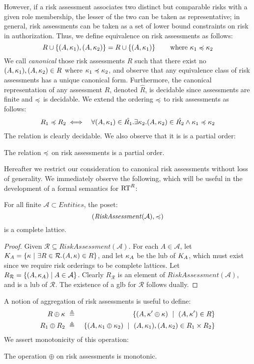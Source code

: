 However, if a risk assessment associates two distinct but comparable
risks with a given role membership, the lesser of the two can be taken
as representative; in general, risk assessments can be taken as a set
of lower bound constraints on risk in authorization.  Thus, we define
equivalence on risk assessments as follows:
$$
R \cup \left\{(A,\kappa_1),(A,\kappa_2)\right\} = R \cup \left\{(A,\kappa_1)\right\} 
\qquad \text{where } \kappa_1 \preccurlyeq \kappa_2 
$$ 
We call \emph{canonical} those risk assessments $R$ such that there
exist no $(A,\kappa_1), (A,\kappa_2) \in R$ where $\kappa_1 \preccurlyeq \kappa_2$,
and observe that any equivalence class of risk assessments has 
a unique canonical form.  Furthermore, the canonical representation 
of any assessment $R$, denoted $\hat{R}$, is decidable since
assessments are finite and $\preccurlyeq$ is decidable.   We extend the 
ordering $\preccurlyeq$ to risk assessments as follows:
\begin{eqnarray*}
R_1 \preccurlyeq R_2 &\iff& \forall (A,\kappa_1) \in \hat{R_1} . \exists \kappa_2. 
(A,\kappa_2) \in \hat{R_2} \wedge \kappa_1 \preccurlyeq \kappa_2
\end{eqnarray*}
The relation is clearly decidable.  We also observe that it is
is a partial order:
\begin{corollary}
The relation $\preccurlyeq$ on risk assessments is a partial order.
\end{corollary} 
Hereafter we restrict our consideration to canonical risk assessments
without loss of generality.  We immediately observe the following,
which will be useful in the development of a formal semantics for 
$\text{RT}^R$:
\begin{lemma}
\label{lemma-assessmentlattice}
For all finite $\mathcal{A} \subset \mathit{Entities}$, the poset:
$$(\mathit{RiskAssessment}(\mathcal{A}),\preccurlyeq)$$
is a complete lattice. 
\end{lemma}
\begin{proof}
Given $\mathcal{R} \subseteq \mathit{RiskAssessment}(\mathcal{A})$.
For each $A \in \mathcal{A}$, let $K_A =
\left\{\kappa\ |\ \exists R \in \mathcal{R} . (A,\kappa) \in R\right\}$, 
and let $\kappa_A$ be the lub of $K_A$, which must exist since 
we require risk orderings to be complete lattices.  Let
$R_{\mathcal{R}} = \left\{(A,\kappa_A) \mid A \in \mathcal{A}\right\}$.
Clearly $R_{\mathcal{R}}$  is an element of 
$\mathit{RiskAssessment}(\mathcal{A})$,
and is a lub of $\mathcal{R}$.  The existence of a glb for 
$\mathcal{R}$ follows dually.
\end{proof}
A notion of aggregation of risk assessments 
is useful to define:
\begin{eqnarray*}
R \oplus \risk &\ \defeq\ & \setdefn{(A,\risk' \oplus \risk) \ \mid\ (A,\risk') \in R}\\
R_1 \oplus R_2 &\ \defeq\ &
\setdefn{(A,\risk_1 \oplus \risk_2) \ \mid\ 
(A,\risk_1), (A,\risk_2) \in R_1 \times R_2} 
\end{eqnarray*}
We assert monotonicity of this operation:
\begin{corollary}
\label{cor-oplusmonotonic}
The operation $\oplus$ on risk assessments is monotonic.
\end{corollary}

